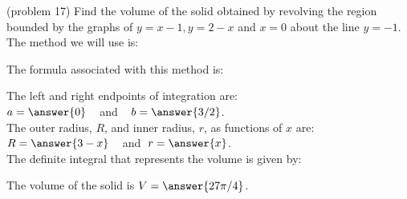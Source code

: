 \documentclass{ximera}
\begin{document}
\begin{problem}(problem 17)
Find the volume of the solid obtained by revolving the region bounded by the graphs of $y = x-1, y = 2- x$ and $x = 0$ about the line $y = -1$.\\
The method we will use is:
\begin{multipleChoice}
\end{multipleChoice}

The formula associated with this method is:
\begin{multipleChoice}
\end{multipleChoice}

The left and right endpoints of integration are:\\
$a = \answer{0}\;\;\;$ and $\;\;\; b = \answer{3/2}$.\\
The outer radius, $R$, and inner radius, $r$, as functions of $x$ are:\\
$R = \answer{3-x} \;\;\;$ and $\; r = \answer{x}$.\\

The definite integral that represents the volume is given by:\\
\begin{multipleChoice}
\end{multipleChoice}

The volume of the solid is $V = \answer{27\pi/4}$.

\end{problem}
\end{document}
